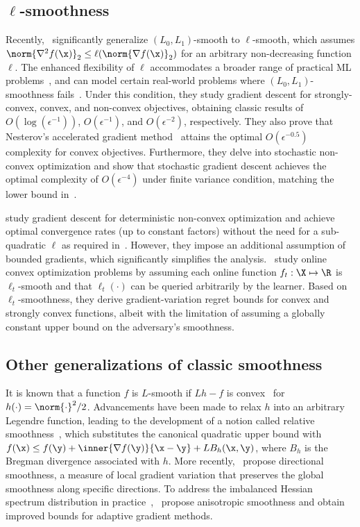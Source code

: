 \subsection{$\ell$-smoothness}
Recently,~\citet{Li2023GS} significantly generalize $(L_0,L_1)$-smooth to $\ell$-smooth, which assumes $\norm{\nabla^2 f(\x)}_2\le \ell(\norm{\nabla f(\x)}_2)$ for an arbitrary non-decreasing function $\ell$. The enhanced flexibility of $\ell$ accommodates a broader range of practical ML problems~\citep{devlin-etal-2019-bert,caron2021emerging,radford2021learning}, and can model certain real-world problems where $(L_0,L_1)$-smoothness fails~\citep{cooper2024theoretical}. Under this condition, they study gradient descent for strongly-convex, convex, and non-convex objectives, obtaining classic results of $O(\log(\epsilon^{-1}))$, $O(\epsilon^{-1})$, and $O(\epsilon^{-2})$, respectively. They also prove that Nesterov's accelerated gradient method~\citep{nesterov1983method} attains the optimal $O(\epsilon^{-0.5})$ complexity for convex objectives. Furthermore, they delve into stochastic non-convex optimization and show that stochastic gradient descent achieves the optimal complexity of $O(\epsilon^{-4})$ under finite variance condition, matching the lower bound in~\citet{arjevani2023lower}.
\setParDis

\citet{tyurin2024toward} study gradient descent for deterministic non-convex optimization and achieve optimal convergence rates (up to constant factors) without the need for a sub-quadratic \(\ell\) as required in~\citet{Li2023GS}. However, they impose an additional assumption of bounded gradients, which significantly simplifies the analysis.~\citet{NeurIPS'24:LocalSmooth} study online convex optimization problems by assuming each online function $f_t:\X\mapsto\R$ is $\ell_t$-smooth and that $\ell_t(\cdot)$ can be queried arbitrarily by the learner. Based on $\ell_t$-smoothness, they derive gradient-variation regret bounds for convex and strongly convex functions, albeit with the limitation of assuming a globally constant upper bound on the adversary's smoothness. 

\subsection{Other generalizations of classic smoothness}
It is known that a function $f$ is $L$-smooth if $Lh-f$ is convex~\citep{nesterov2018lectures} for $h(\cdot)=\norm{\cdot}^2/2$. Advancements have been made to relax $h$ into an arbitrary Legendre function, leading to the development of a notion called relative smoothness~\citep{Bauschke17descentlemma,lu18relativesmooth}, which substitutes the canonical quadratic upper bound with $f(\x)\le f(\y)+\inner{\nabla f(\y)}{\x-\y}+LB_h(\x,\y)$, where $B_h$ is the Bregman divergence associated with $h$. More recently,~\citet{mishkin2024directional} propose directional smoothness, a measure of local gradient variation that preserves the global smoothness along specific directions. To address the imbalanced Hessian spectrum distribution in practice~\citep{sagun2016eigenvalues,pan2022eigencurve},~\citet{jiang2024convergence,liu2024adagrad} propose anisotropic smoothness and obtain improved bounds for adaptive gradient methods.